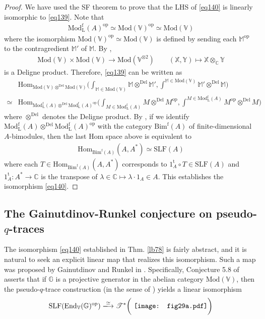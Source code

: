\documentclass[11pt,b5paper,notitlepage]{article}
\theoremstyle{definition}
\theoremstyle{plain}
\newcommand{\tr}{\mathrm{t}} %
\newcommand{\End}{\mathrm{End}} %
\newcommand{\Hom}{\mathrm{Hom}}
\newcommand{\opp}{\mathrm{op}}
\newcommand{\SLF}{\mathrm{SLF}}
\newcommand{\mbb}{\mathbb}
\newcommand{\Vbb}{\mathbb V}
\newcommand{\Xbb}{\mathbb X}
\newcommand{\Mbb}{\mathbb M}
\newcommand{\Gbb}{\mathbb G}
\newcommand{\Cbb}{\mathbb C}
\newcommand{\<}{\left\langle}
\renewcommand{\>}{\right\rangle}
\newcommand{\ST}{\mathscr{T}}
\newcommand{\Mod}{\mathrm{Mod}}
\newcommand{\ModfL}{\mathrm{Mod}^{\mathrm f}_{\mathrm L}}
\newcommand{\Del}{\mathrm{Del}}
\numberwithin{equation}{section}
\begin{document}
\begin{proof}
We have used the SF theorem to prove that the LHS of \eqref{eq140} is linearly isomorphic to \eqref{eq139}. Note that
\begin{align*}
\ModfL(A)^\opp\simeq\Mod(\Vbb)^\opp\simeq\Mod(\Vbb)
\end{align*}
where the isomorphism $\Mod(\Vbb)^\opp\simeq\Mod(\Vbb)$ is defined by sending each $\Mbb^\opp$ to the contragredient $\Mbb'$ of $\Mbb$. By \cite{McR-deligne}, 
\begin{align*}
\Mod(\Vbb)\times\Mod(\Vbb)\rightarrow\Mod(\Vbb^{\otimes2})\qquad(\Xbb,\mbb Y)\mapsto\Xbb\otimes_\Cbb\mbb Y
\end{align*}
is a Deligne product. Therefore, \eqref{eq139} can be written as
\begin{align*}
&\Hom_{\Mod(\Vbb)\otimes^\Del\Mod(\Vbb)}\Big(\int_{\Mbb\in\Mod(\Vbb)}\Mbb\otimes^\Del\Mbb',\int^{\Mbb\in\Mod(\Vbb)}\Mbb'\otimes^\Del\Mbb\Big)\\
\simeq&\Hom_{\ModfL(A)\otimes^\Del\ModfL(A)^\opp}\Big(\int_{M\in\ModfL(A)}M\otimes^\Del M^\opp,\int^{M\in\ModfL(A)}M^\opp\otimes^\Del M\Big)
\end{align*}
where $\otimes^\Del$ denotes the Deligne product. By \cite[Cor. 2.9]{FSS20}, if we identify $\ModfL(A)\otimes^\Del\ModfL(A)^\opp$ with the category $\mathrm{Bim}^{\mathrm f}(A)$ of finite-dimensional $A$-bimodules, then the last Hom space above is equivalent to
\begin{align*}
\Hom_{\mathrm{Bim}^{\mathrm f}(A)}(A,A^*)\simeq\SLF(A)
\end{align*}
where each $T\in \Hom_{\mathrm{Bim}^{\mathrm f}(A)}(A,A^*)$ corresponds to $1_A^\tr\circ T\in\SLF(A)$ and $1_A^\tr:A^*\rightarrow\Cbb$ is the transpose of $\lambda\in\Cbb\mapsto \lambda\cdot 1_A\in A$. This establishes the isomorphism \eqref{eq140}.
\end{proof}



\subsection{The Gainutdinov-Runkel conjecture on pseudo-$q$-traces}


The isomorphism \eqref{eq140} established in Thm. \ref{lb78} is fairly abstract, and it is natural to seek an explicit linear map that realizes this isomorphism. Such a map was proposed by Gainutdinov and Runkel in \cite{GR-Verlinde}. Specifically, Conjecture 5.8 of \cite{GR-Verlinde} asserts that if $\Gbb$ is a projective generator in the abelian category $\Mod(\Vbb)$, then the pseudo-$q$-trace construction (in the sense of \cite{AN-pseudo-trace}) yields a linear isomorphism
\begin{align}\label{eq141}
\SLF(\End_\Vbb(\Gbb)^\opp)\xlongrightarrow{\simeq}\ST^*\bigg(\vcenter{\hbox{{
		\texttt{[image: fig29a.pdf]}}}}\bigg)
\end{align}
\end{document}
